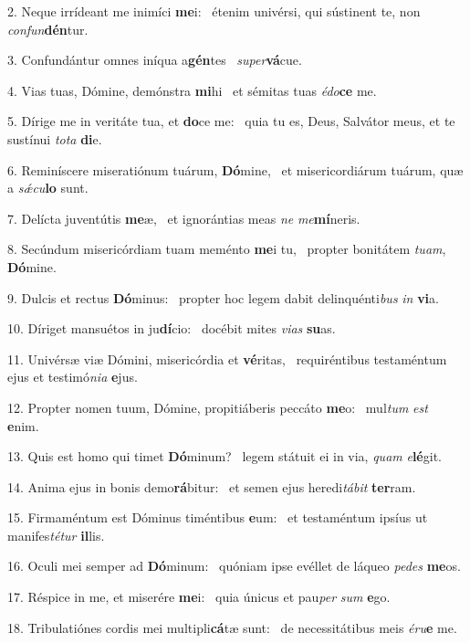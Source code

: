2. Neque irrídeant me inimíci \textbf{me}i: \ast\  étenim univérsi, qui sústinent te, non \textit{con}\textit{fun}\textbf{dén}tur.\

3. Confundántur omnes iníqua a\textbf{gén}tes \ast\  \textit{su}\textit{per}\textbf{vá}cue.\

4. Vias tuas, Dómine, demónstra \textbf{mi}hi \ast\  et sémitas tuas \textit{é}\textit{do}\textbf{ce} me.\

5. Dírige me in veritáte tua, et \textbf{do}ce me: \ast\  quia tu es, Deus, Salvátor meus, et te sustínui \textit{to}\textit{ta} \textbf{di}e.\

6. Reminíscere miseratiónum tuárum, \textbf{Dó}mine, \ast\  et misericordiárum tuárum, quæ a \textit{sǽ}\textit{cu}\textbf{lo} sunt.\

7. Delícta juventútis \textbf{me}æ, \ast\  et ignorántias meas \textit{ne} \textit{me}\textbf{mí}neris.\

8. Secúndum misericórdiam tuam meménto \textbf{me}i tu, \ast\  propter bonitátem \textit{tu}\textit{am}, \textbf{Dó}mine.\

9. Dulcis et rectus \textbf{Dó}minus: \ast\  propter hoc legem dabit delinquénti\textit{bus} \textit{in} \textbf{vi}a.\

10. Díriget mansuétos in ju\textbf{dí}cio: \ast\  docébit mites \textit{vi}\textit{as} \textbf{su}as.\

11. Univérsæ viæ Dómini, misericórdia et \textbf{vé}ritas, \ast\  requiréntibus testaméntum ejus et testimó\textit{ni}\textit{a} \textbf{e}jus.\

12. Propter nomen tuum, Dómine, propitiáberis peccáto \textbf{me}o: \ast\  mul\textit{tum} \textit{est} \textbf{e}nim.\

13. Quis est homo qui timet \textbf{Dó}minum? \ast\  legem státuit ei in via, \textit{quam} \textit{e}\textbf{lé}git.\

14. Anima ejus in bonis demo\textbf{rá}bitur: \ast\  et semen ejus heredi\textit{tá}\textit{bit} \textbf{ter}ram.\

15. Firmaméntum est Dóminus timéntibus \textbf{e}um: \ast\  et testaméntum ipsíus ut manifes\textit{té}\textit{tur} \textbf{il}lis.\

16. Oculi mei semper ad \textbf{Dó}minum: \ast\  quóniam ipse evéllet de láqueo \textit{pe}\textit{des} \textbf{me}os.\

17. Réspice in me, et miserére \textbf{me}i: \ast\  quia únicus et pau\textit{per} \textit{sum} \textbf{e}go.\

18. Tribulatiónes cordis mei multipli\textbf{cá}tæ sunt: \ast\  de necessitátibus meis \textit{é}\textit{ru}\textbf{e} me.\

